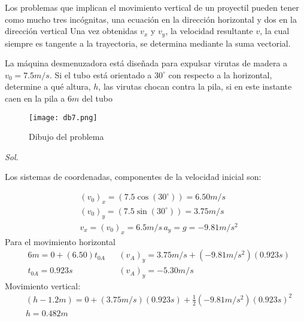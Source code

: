 Los problemas que implican el movimiento vertical de un proyectil pueden tener como mucho tres incógnitas, una ecuación en la dirección horizontal y dos en la dirección vertical 
Una vez obtenidas $v_x$ y $v_y$, la velocidad resultante $v$, la cual siempre es tangente a la trayectoria, se determina mediante la suma vectorial.

\begin{example}
    La máquina desmenuzadora está diseñada para expulsar virutas de madera a $v_0=7.5m/s$. Si el tubo está orientado a $30^{\circ}$ con respecto a la horizontal, determine a qué altura, $h$, las virutas chocan contra la pila, si en este instante caen en la pila a $6m$ del tubo
\end{example}

\begin{figure}[h!]
  \centerline{\texttt{[image: db7.png]}}
  \caption{Dibujo del problema}
  \label{db7}
\end{figure}

\textit{ Sol. }

Los sistemas de coordenadas, componentes de la velocidad inicial son: 

\begin{align*}
    &(v_0)_x=(7.5\cos{(30^{\circ})})=6.50m/s\\
    &(v_0)_y=(7.5\sin{(30^{\circ})})=3.75m/s\\
    &v_x=(v_0)_x=6.5m/s\, a_y=g=-9.81m/s^2
\end{align*}
Para el movimiento horizontal
\begin{align*}
    &6m=0+(6.50)t_{0A}&&(v_A)_y=3.75m/s+(-9.81m/s^2)(0.923s)\\
    &t_{0A}=0.923s&&(v_A)_y=-5.30m/s
\end{align*}
Movimiento vertical: 
\begin{align*}
    &(h-1.2m)=0+(3.75m/s)(0.923s)+\frac{1}{2}(-9.81m/s^2)(0.923s)^2\\
    &h=0.482m
\end{align*}

